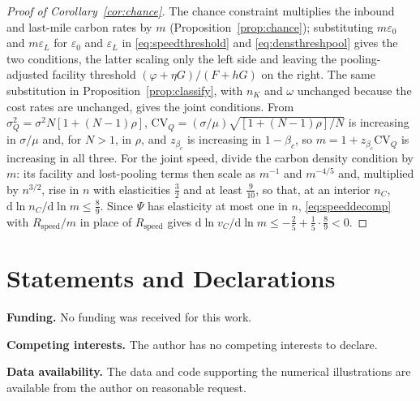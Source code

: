 \documentclass[11pt]{article}
\theoremstyle{definition}
\theoremstyle{remark}
\theoremstyle{plain}
\begin{document}
\begin{proof}[Proof of Corollary~\ref{cor:chance}]
The chance constraint multiplies the inbound and last-mile carbon rates by $m$
(Proposition~\ref{prop:chance}); substituting $m\varepsilon_0$ and $m\varepsilon_L$ for $\varepsilon_0$ and
$\varepsilon_L$ in \eqref{eq:speedthreshold} and \eqref{eq:densthreshpool} gives the two conditions, the latter
scaling only the left side and leaving the pooling-adjusted facility threshold $(\varphi+\eta G)/(F+hG)$ on
the right. The same substitution in Proposition~\ref{prop:classify}, with $n_K$ and $\omega$ unchanged because
the cost rates are unchanged, gives the joint conditions. From $\sigma_Q^2=\sigma^2N[1+(N-1)\rho]$, $\mathrm{CV}_Q=(\sigma/\mu)\sqrt{[1+(N-1)\rho]/N}$ is
increasing in $\sigma/\mu$ and, for $N>1$, in $\rho$, and $z_{\beta_c}$ is increasing in $1-\beta_c$, so
$m=1+z_{\beta_c}\mathrm{CV}_Q$ is increasing in all three. For the joint speed, divide the carbon density
condition by $m$: its facility and lost-pooling terms then scale as $m^{-1}$ and $m^{-4/5}$ and, multiplied by
$n^{3/2}$, rise in $n$ with elasticities $\tfrac32$ and at least $\tfrac9{10}$, so that, at an interior $n_C$,
$\mathrm d\ln n_C/\mathrm d\ln m\le\tfrac89$. Since $\Psi$ has elasticity at most one in $n$,
\eqref{eq:speeddecomp} with $R_{\mathrm{speed}}/m$ in place of $R_{\mathrm{speed}}$ gives
$\mathrm d\ln v_C/\mathrm d\ln m\le-\tfrac25+\tfrac15\cdot\tfrac89<0$.
\end{proof}

\section*{Statements and Declarations}

\noindent\textbf{Funding.} No funding was received for this work.

\smallskip
\noindent\textbf{Competing interests.} The author has no competing interests to declare.

\smallskip
\noindent\textbf{Data availability.} The data and code supporting the numerical illustrations are available
from the author on reasonable request.



\end{document}
